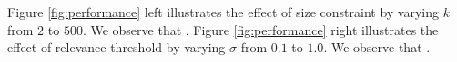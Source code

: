 Figure \ref{fig:performance} left illustrates the effect of size constraint by varying $k$ from $2$ to $500$. We observe that . Figure \ref{fig:performance} right illustrates the effect of relevance threshold by varying $\sigma$ from $0.1$ to $1.0$. We observe that .

%
%
%
%
